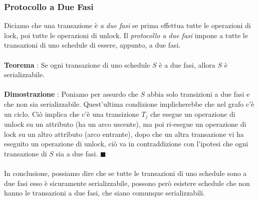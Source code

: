 \documentclass[12pt, letterpaper]{article}
\newcommand{\acc}{\\\hphantom{}\\}
\begin{document}
\subsubsection{Protocollo a Due Fasi}
Diciamo che una transazione è \textit{a due fasi} se prima effettua tutte le operazioni di lock, poi tutte le operazioni 
di unlock. Il \textit{protocollo a due fasi} impone a tutte le transazioni di uno schedule di essere, appunto, a due fasi.\acc 
\textbf{Teorema} : Se ogni transazione di uno schedule \(S\) è a due fasi, allora \(S\) è serializzabile.\acc 
\textbf{Dimostrazione} : Poniamo per assurdo che \(S\) abbia solo transizioni a due fasi e che non sia serializzabile. Quest'ultima 
condizione implicherebbe che nel grafo c'è un ciclo. Ciò implica che c'è una transizione \(T_j\) che esegue un operazione di 
unlock su un attributo (ha un arco uscente), ma poi ri-esegue un operazione di lock su un altro attributo (arco entrante), dopo 
che un altra transazione vi ha eseguito un operazione di unlock, ciò va in contraddizione con l'ipotesi 
che ogni transazione di \(S\) sia a due fasi. \(\blacksquare\)\acc 
In conclusione, possiamo dire che se tutte le transazioni di uno schedule sono a due fasi esso è sicuramente serializzabile, 
possono però esistere schedule che non hanno le transazioni a due fasi, che siano comunque serializzabili.\\
\end{document}
